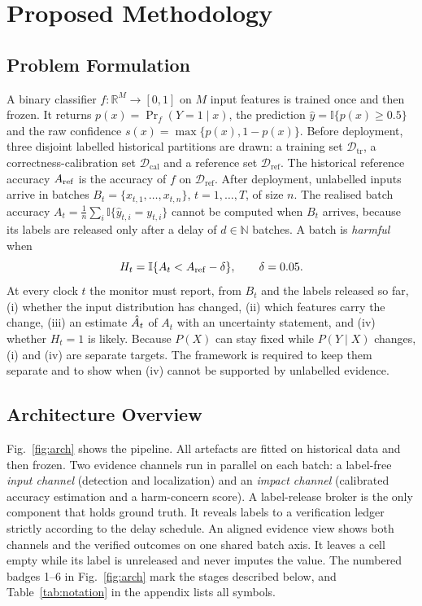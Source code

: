 \section{Proposed Methodology}
\label{sec:method}

\subsection{Problem Formulation}
\label{sec:formulation}
A binary classifier $f:\mathbb{R}^{M}\rightarrow[0,1]$ on $M$ input features is
trained once and then frozen. It returns $p(x)=\Pr_f(Y{=}1\mid x)$, the prediction
$\hat{y}=\mathbb{I}\{p(x)\ge 0.5\}$ and the raw confidence
$s(x)=\max\{p(x),1-p(x)\}$. Before deployment, three disjoint labelled historical
partitions are drawn: a training set $\mathcal{D}_{\mathrm{tr}}$, a
correctness-calibration set $\mathcal{D}_{\mathrm{cal}}$ and a reference set
$\mathcal{D}_{\mathrm{ref}}$. The historical reference accuracy
$A_{\mathrm{ref}}$ is the accuracy of $f$ on $\mathcal{D}_{\mathrm{ref}}$.
After deployment, unlabelled inputs arrive in batches
$B_t=\{x_{t,1},\dots,x_{t,n}\}$, $t=1,\dots,T$, of size $n$. The realised batch
accuracy $A_t=\frac{1}{n}\sum_{i}\mathbb{I}\{\hat{y}_{t,i}=y_{t,i}\}$ cannot be
computed when $B_t$ arrives, because its labels are released only after a delay of
$d\in\mathbb{N}$ batches. A batch is \emph{harmful} when
\begin{equation}
H_t=\mathbb{I}\{A_t<A_{\mathrm{ref}}-\delta\},\qquad \delta=0.05.
\label{eq:harm}
\end{equation}
At every clock $t$ the monitor must report, from $B_t$ and the labels released so
far, (i) whether the input distribution has changed, (ii) which features carry the
change, (iii) an estimate $\hat{A}_t$ of $A_t$ with an uncertainty statement, and
(iv) whether $H_t=1$ is likely. Because $P(X)$ can stay fixed while $P(Y\mid X)$
changes, (i) and (iv) are separate targets. The framework is required to keep them
separate and to show when (iv) cannot be supported by unlabelled evidence.

\subsection{Architecture Overview}
Fig.~\ref{fig:arch} shows the \idm{} pipeline. All artefacts are fitted on
historical data and then frozen. Two evidence channels run in parallel on each
batch: a label-free \emph{input channel} (detection and localization) and an
\emph{impact channel} (calibrated accuracy estimation and a harm-concern score).
A label-release broker is the only component that holds ground truth. It
reveals labels to a verification ledger strictly according to the delay schedule.
An aligned evidence view shows both channels and the verified outcomes on one
shared batch axis. It leaves a cell empty while its label is unreleased and never
imputes the value. The numbered badges 1--6 in Fig.~\ref{fig:arch} mark the stages
described below, and Table~\ref{tab:notation} in the appendix lists all symbols.

